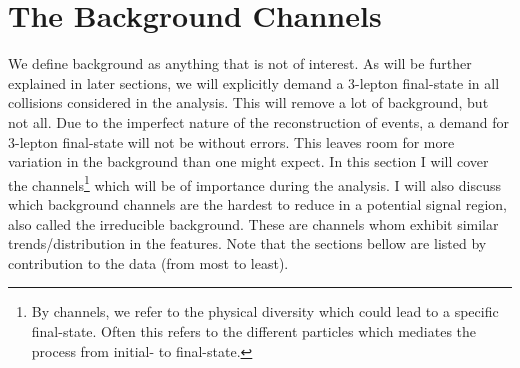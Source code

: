 \section{The Background Channels}
We define background as anything that is not of interest. As will be further explained in  later sections,
we will explicitly demand a 3-lepton final-state in all collisions considered in the analysis. This will 
remove a lot of background, but not all. Due to the imperfect nature of the reconstruction of events,
a demand for 3-lepton final-state will not be without errors. This leaves room for more variation in 
the background than one might expect. In this section I will cover the channels\footnote{By channels,
we refer to the physical diversity which could lead to a specific final-state. Often this refers to 
the different particles which mediates the process from initial- to final-state.} which will 
be of importance during the analysis. I will also discuss which background channels are the hardest 
to reduce in a potential signal region, also called the irreducible background. These are 
channels whom exhibit similar trends/distribution in the features. Note that the sections bellow
are listed by contribution to the data (from most to least).  

